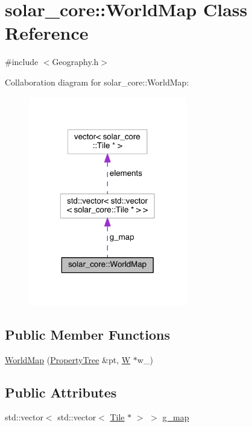 \hypertarget{classsolar__core_1_1_world_map}{}\section{solar\+\_\+core\+:\+:World\+Map Class Reference}
\label{classsolar__core_1_1_world_map}


{\ttfamily \#include $<$Geography.\+h$>$}



Collaboration diagram for solar\+\_\+core\+:\+:World\+Map\+:\nopagebreak
\begin{figure}[H]
\begin{center}
\leavevmode
\includegraphics[width=196pt]{classsolar__core_1_1_world_map__coll__graph}
\end{center}
\end{figure}
\subsection*{Public Member Functions}
\begin{DoxyCompactItemize}
\item 
\hyperlink{classsolar__core_1_1_world_map_a9e3b75ab78e2754c06a777c1cf55c43a}{World\+Map} (\hyperlink{namespacesolar__core_adeda2737d6938c190eb774a5b2495045}{Property\+Tree} \&pt, \hyperlink{classsolar__core_1_1_w}{W} $\ast$w\+\_\+)
\end{DoxyCompactItemize}
\subsection*{Public Attributes}
\begin{DoxyCompactItemize}
\item 
std\+::vector$<$ std\+::vector$<$ \hyperlink{classsolar__core_1_1_tile}{Tile} $\ast$ $>$ $>$ \hyperlink{classsolar__core_1_1_world_map_a2b94f74fcea57d3e01d8cab8348e1c48}{g\+\_\+map}
\end{DoxyCompactItemize}


